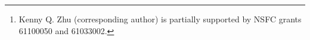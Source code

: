 
\begin{abstract}
  A class of search queries which contain abstract concepts are studied in
this paper. These queries cannot be correctly interpreted by traditional keyword-based search engines.
  This paper presents a simple framework that detects and instantiates the
abstract concepts by their concrete entities or meanings to produce alternate
queries that yield better search results.
\footnote{Kenny Q. Zhu (corresponding author) is partially
supported by NSFC grants 61100050 and 61033002.}
\end{abstract}
